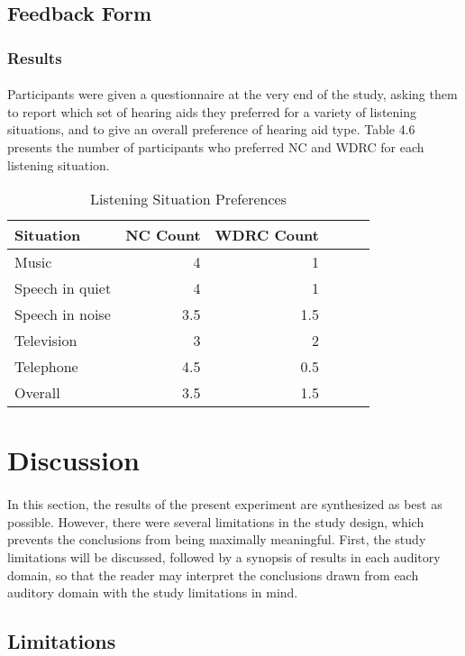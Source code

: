 \subsection{Feedback Form}
\subsubsection{Results}
\paragraph{}Participants were given a questionnaire at the very end of the study, asking them to report which set of hearing aids they preferred for a variety of listening situations, and to give an overall preference of hearing aid type.  Table 4.6 presents the number of participants who preferred NC and WDRC for each listening situation.

\begin{table}[htp]
\centering
\begin{tabular}{lrrrrr}
  \hline
  Situation & NC Count & WDRC Count \\
  \hline
  Music        & 4 & 1 \\
  Speech in quiet & 4 & 1 \\
  Speech in noise & 3.5 & 1.5 \\
  Television & 3 & 2 \\
  Telephone & 4.5 & 0.5 \\
  Overall & 3.5 & 1.5 \\
   \hline
\end{tabular}
\caption{Listening Situation Preferences}
\end{table}

\section{Discussion}
\paragraph{}In this section, the results of the present experiment are synthesized as best as possible.  However, there were several limitations in the study design, which prevents the conclusions from being maximally meaningful.  First, the study limitations will be discussed, followed by a synopsis of results in each auditory domain, so that the reader may interpret the conclusions drawn from each auditory domain with the study limitations in mind.

\subsection{Limitations}
